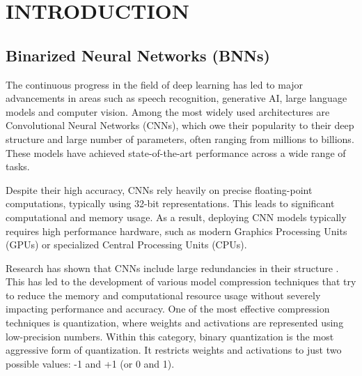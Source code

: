 \documentclass[a4paper,12pt]{report}
\begin{document}
\tableofcontents

\listoffigures

\listoftables

\begin{symbols-abbreviations}
\end{symbols-abbreviations}



\clearpage
\chapter{INTRODUCTION}
\label{chapter:introduction}


\section{Binarized Neural Networks (BNNs)}
The continuous progress in the field of deep learning \cite{lecun2015deep} has led to major advancements in areas such as speech recognition, generative AI, large language models and computer vision. Among the most widely used architectures are Convolutional Neural Networks (CNNs), which owe their popularity to their deep structure and large number of parameters, often ranging from millions to billions. These models have achieved state-of-the-art performance across a wide range of tasks.

Despite their high accuracy, CNNs rely heavily on precise floating-point computations, typically using 32-bit representations. This leads to significant computational and memory usage. As a result, deploying CNN models typically requires high performance hardware, such as modern Graphics Processing Units (GPUs) or specialized Central Processing Units (CPUs).

Research has shown that CNNs include large redundancies in their structure \cite{6797077}. This has led to the development of various model compression techniques that try to reduce the memory and computational resource usage without severely impacting performance and accuracy. One of the most effective compression techniques is quantization, where weights and activations are represented using low-precision numbers. Within this category, binary quantization is the most aggressive form of quantization. It restricts weights and activations to just two possible values: -1 and +1 (or 0 and 1).
\end{document}
